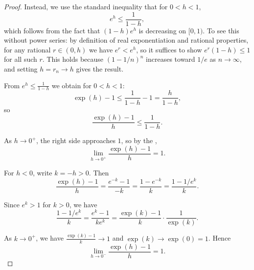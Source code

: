 \begin{proof}


Instead, we use the standard inequality that for $0 < h < 1$,
$$e^h \leq \frac{1}{1-h},$$
which follows from the fact that $(1-h)e^h$ is decreasing on $[0,1)$. To see this without power series: by definition of real exponentiation and rational properties, for any rational $r \in (0,h)$ we have $e^r < e^h$, so it suffices to show $e^r(1-h) \leq 1$ for all such $r$. This holds because $(1-1/n)^n$ increases toward $1/e$ as $n \to \infty$, and setting $h = r_n \to h$ gives the result.

From $e^h \leq \frac{1}{1-h}$ we obtain for $0 < h < 1$:
$$\exp(h) - 1 \leq \frac{1}{1-h} - 1 = \frac{h}{1-h},$$
so
$$\frac{\exp(h)-1}{h} \leq \frac{1}{1-h}.$$

As $h \to 0^+$, the right side approaches $1$, so by the ,
$$\lim_{h \to 0^+} \frac{\exp(h)-1}{h} = 1.$$

For $h < 0$, write $k = -h > 0$. Then
$$\frac{\exp(h) - 1}{h} = \frac{e^{-k}-1}{-k} = \frac{1-e^{-k}}{k} = \frac{1 - 1/e^k}{k}.$$

Since $e^k > 1$ for $k > 0$, we have
$$\frac{1 - 1/e^k}{k} = \frac{e^k-1}{k e^k} = \frac{\exp(k)-1}{k} \cdot \frac{1}{\exp(k)}.$$

As $k \to 0^+$, we have $\frac{\exp(k)-1}{k} \to 1$ and $\exp(k) \to \exp(0) = 1$. Hence
$$\lim_{h \to 0^-} \frac{\exp(h)-1}{h} = 1.$$


\end{proof}
